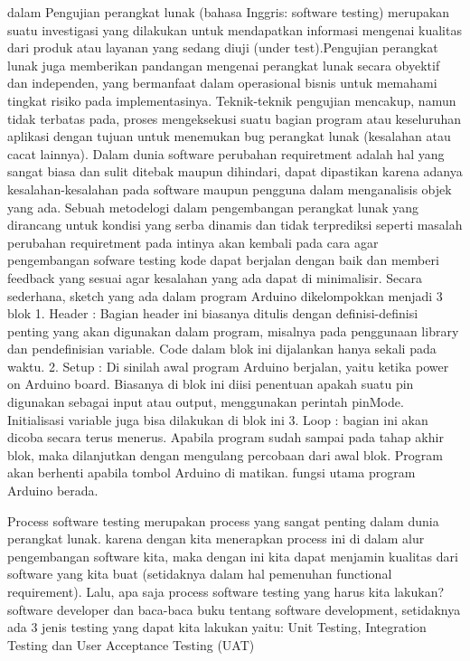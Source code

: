 dalam \cite{evans2013arduino} Pengujian perangkat lunak (bahasa Inggris: software testing) merupakan suatu investigasi yang dilakukan untuk mendapatkan informasi mengenai kualitas dari produk atau layanan yang sedang diuji (under test).Pengujian perangkat lunak juga memberikan pandangan mengenai perangkat lunak secara obyektif dan independen, yang bermanfaat dalam operasional bisnis untuk memahami tingkat risiko pada implementasinya. Teknik-teknik pengujian mencakup, namun tidak terbatas pada, proses mengeksekusi suatu bagian program atau keseluruhan aplikasi dengan tujuan untuk menemukan bug perangkat lunak (kesalahan atau cacat lainnya).
Dalam dunia software perubahan requiretment adalah hal yang sangat biasa dan sulit ditebak maupun dihindari, dapat dipastikan karena adanya kesalahan-kesalahan pada software maupun pengguna dalam menganalisis objek yang ada. Sebuah metodelogi dalam pengembangan perangkat lunak yang dirancang untuk kondisi yang serba dinamis dan tidak terprediksi seperti masalah perubahan requiretment pada intinya akan kembali pada cara agar pengembangan sofware testing kode dapat berjalan dengan baik dan memberi feedback yang sesuai agar kesalahan yang ada dapat di minimalisir.
Secara sederhana, sketch yang ada dalam program Arduino dikelompokkan menjadi 3 blok 
1.	Header	: Bagian header ini biasanya ditulis dengan definisi-definisi penting yang akan digunakan dalam program, misalnya pada penggunaan library dan pendefinisian variable. Code dalam blok ini dijalankan hanya sekali pada waktu.
2.	Setup	: Di sinilah awal program Arduino berjalan, yaitu ketika power on Arduino board. Biasanya di blok ini diisi penentuan apakah suatu pin digunakan sebagai input atau output, menggunakan perintah pinMode. Initialisasi variable juga bisa dilakukan di blok ini
3.	Loop	: bagian ini akan dicoba secara terus menerus. Apabila program sudah sampai pada tahap akhir blok, maka dilanjutkan dengan mengulang percobaan dari awal blok. Program akan berhenti apabila tombol Arduino di matikan. fungsi utama program Arduino berada.

Process software testing merupakan process yang sangat penting dalam dunia perangkat lunak. karena dengan kita menerapkan process ini di dalam alur pengembangan software kita, maka dengan ini kita dapat menjamin kualitas dari software yang kita buat (setidaknya dalam hal pemenuhan functional requirement). Lalu, apa saja process software testing yang harus kita lakukan? software developer dan baca-baca buku tentang software development, setidaknya ada 3 jenis testing yang dapat kita lakukan yaitu: Unit Testing, Integration Testing dan User Acceptance Testing (UAT)

